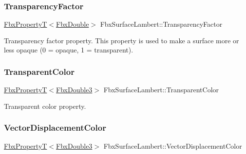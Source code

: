 \mbox{\label{class_fbx_surface_lambert_a9fbe9676ad1a4f56bcbde345113ccccd}} 
\subsubsection{\texorpdfstring{Transparency\+Factor}{TransparencyFactor}}
{\footnotesize\ttfamily \hyperlink{class_fbx_property_t}{Fbx\+PropertyT}$<$\hyperlink{fbxtypes_8h_a171e72a1c46fc15c1a6c9c31948c1c5b}{Fbx\+Double}$>$ Fbx\+Surface\+Lambert\+::\+Transparency\+Factor}

Transparency factor property. This property is used to make a surface more or less opaque (0 = opaque, 1 = transparent). \mbox{\label{class_fbx_surface_lambert_a29a56ddffd15311f51d0b2cbb09d4659}} 
\subsubsection{\texorpdfstring{Transparent\+Color}{TransparentColor}}
{\footnotesize\ttfamily \hyperlink{class_fbx_property_t}{Fbx\+PropertyT}$<$\hyperlink{fbxtypes_8h_ae0a96f14cde566774c7553aa7523b7a7}{Fbx\+Double3}$>$ Fbx\+Surface\+Lambert\+::\+Transparent\+Color}



Transparent color property. 

\mbox{\label{class_fbx_surface_lambert_a917ecf0cc6bbaa04b1378f8951c97ed6}} 
\subsubsection{\texorpdfstring{Vector\+Displacement\+Color}{VectorDisplacementColor}}
{\footnotesize\ttfamily \hyperlink{class_fbx_property_t}{Fbx\+PropertyT}$<$\hyperlink{fbxtypes_8h_ae0a96f14cde566774c7553aa7523b7a7}{Fbx\+Double3}$>$ Fbx\+Surface\+Lambert\+::\+Vector\+Displacement\+Color}



